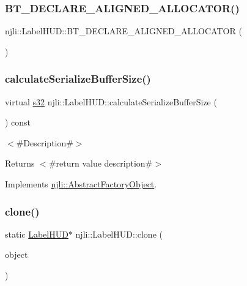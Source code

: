 \subsubsection{\texorpdfstring{B\+T\+\_\+\+D\+E\+C\+L\+A\+R\+E\+\_\+\+A\+L\+I\+G\+N\+E\+D\+\_\+\+A\+L\+L\+O\+C\+A\+T\+O\+R()}{BT\_DECLARE\_ALIGNED\_ALLOCATOR()}}
{\footnotesize\ttfamily njli\+::\+Label\+H\+U\+D\+::\+B\+T\+\_\+\+D\+E\+C\+L\+A\+R\+E\+\_\+\+A\+L\+I\+G\+N\+E\+D\+\_\+\+A\+L\+L\+O\+C\+A\+T\+OR (\begin{DoxyParamCaption}{ }\end{DoxyParamCaption})\hspace{0.3cm}{\ttfamily [protected]}}

\mbox{\label{classnjli_1_1_label_h_u_d_a29bae4b017aa0c6b96dc789a633b9778}} 
\subsubsection{\texorpdfstring{calculate\+Serialize\+Buffer\+Size()}{calculateSerializeBufferSize()}}
{\footnotesize\ttfamily virtual \mbox{\hyperlink{_util_8h_aa62c75d314a0d1f37f79c4b73b2292e2}{s32}} njli\+::\+Label\+H\+U\+D\+::calculate\+Serialize\+Buffer\+Size (\begin{DoxyParamCaption}{ }\end{DoxyParamCaption}) const\hspace{0.3cm}{\ttfamily [virtual]}}

$<$\#\+Description\#$>$

\begin{DoxyReturn}{Returns}
$<$\#return value description\#$>$ 
\end{DoxyReturn}


Implements \mbox{\hyperlink{classnjli_1_1_abstract_factory_object_a4763d05bc9dc37c559111f8bb30e1dd8}{njli\+::\+Abstract\+Factory\+Object}}.

\mbox{\label{classnjli_1_1_label_h_u_d_a19ec4a7244c92dc3bac335d4247e80be}} 
\subsubsection{\texorpdfstring{clone()}{clone()}}
{\footnotesize\ttfamily static \mbox{\hyperlink{classnjli_1_1_label_h_u_d}{Label\+H\+UD}}$\ast$ njli\+::\+Label\+H\+U\+D\+::clone (\begin{DoxyParamCaption}\item[{const \mbox{\hyperlink{classnjli_1_1_label_h_u_d}{Label\+H\+UD}} \&}]{object }\end{DoxyParamCaption})\hspace{0.3cm}{\ttfamily [static]}}

